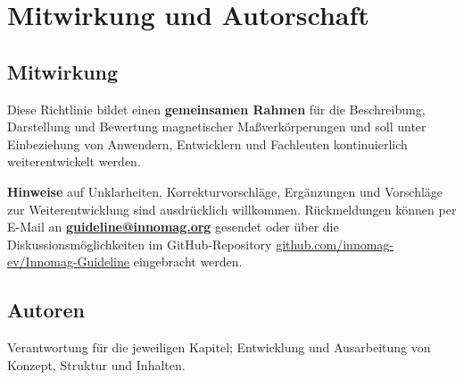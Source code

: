 \documentclass[
  ngerman,
  a4paper,
  twoside]{scrbook}
\makeatletter
\newcommand{\innomag@addcontentsline}[3]{%
  \ifstrequal{#1}{toc}{%
    \ifstrequal{#2}{chapter}{%
      \IfBeginWith{\@currentHref}{chapter.}{}{%
        \phantomsection
      }%
    }{}%
  }{}%
  \innomag@originaladdcontentsline{#1}{#2}{#3}%
}
\let\innomag@originaladdcontentsline\addcontentsline
\let\addcontentsline\innomag@addcontentsline
\renewcommand*\contentsname{Inhaltsverzeichnis}
\newcommand\contentsname{Inhaltsverzeichnis}
\makeatother
\begin{document}


\renewcommand*\contentsname{Inhaltsverzeichnis}
{
\setcounter{tocdepth}{1}
\tableofcontents
}
\listoffigures
\listoftables

\mainmatter
{}

\chapter*{Mitwirkung und Autorschaft}\label{mitwirkung-und-autorschaft}


\section*{Mitwirkung}\label{mitwirkung}


Diese Richtlinie bildet einen \textbf{gemeinsamen Rahmen} für die
Beschreibung, Darstellung und Bewertung magnetischer Maßverkörperungen
und soll unter Einbeziehung von Anwendern, Entwicklern und Fachleuten
kontinuierlich weiterentwickelt werden.

\textbf{Hinweise} auf Unklarheiten, Korrekturvorschläge, Ergänzungen und
Vorschläge zur Weiterentwicklung sind ausdrücklich willkommen.
Rückmeldungen können per E-Mail an
\href{mailto:guideline@innomag.org}{\textbf{guideline@innomag.org}}
gesendet oder über die Diskussionsmöglichkeiten im GitHub-Repository
\href{https://github.com/innomag-ev/Innomag-Guideline}{github.com/innomag-ev/Innomag-Guideline}
eingebracht werden.

\section*{Autoren}\label{autoren}


Verantwortung für die jeweiligen Kapitel; Entwicklung und Ausarbeitung
von Konzept, Struktur und Inhalten.
\end{document}
